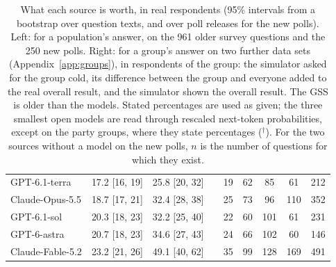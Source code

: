 \begin{table}[t]
\begin{tabular}{lcccccccc}
GPT-6.1-terra & 17.2 {\scriptsize[16, 19]} & 25.8 {\scriptsize[20, 32]} & & 19 & 62 & 85 & 61 & 212 \\
Claude-Opus-5.5 & 18.7 {\scriptsize[17, 21]} & 32.4 {\scriptsize[28, 38]} & & 25 & 73 & 96 & 110 & 352 \\
GPT-6.1-sol & 20.3 {\scriptsize[18, 23]} & 32.2 {\scriptsize[25, 40]} & & 22 & 60 & 101 & 61 & 231 \\
GPT-6-astra & 20.7 {\scriptsize[18, 23]} & 34.6 {\scriptsize[27, 43]} & & 24 & 66 & 102 & 60 & 146 \\
Claude-Fable-5.2 & 23.2 {\scriptsize[21, 26]} & 49.1 {\scriptsize[40, 62]} & & 35 & 99 & 128 & 169 & 491 \\
\bottomrule
\end{tabular}
\caption{What each source is worth, in real respondents (95\% intervals from a bootstrap over question texts, and over poll releases for the new polls). Left: for a population's answer, on the 961 older survey questions and the 250 new polls. Right: for a group's answer on two further data sets (Appendix~\ref{app:groups}), in respondents of the group: the simulator asked for the group cold, its difference between the group and everyone added to the real overall result, and the simulator shown the overall result. The GSS is older than the models. Stated percentages are used as given; the three smallest open models are read through rescaled next-token probabilities, except on the party groups, where they state percentages ($^\dagger$). For the two sources without a model on the new polls, $n$ is the number of questions for which they exist.}
\label{tab:ladder}
\end{table}
